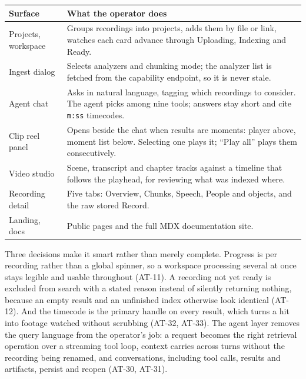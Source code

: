 \documentclass[11pt,a4paper]{article}
\begin{document}
\begin{center}
\centering
\footnotesize
\begin{tabularx}{\textwidth}{@{}L{2.8cm}X@{}}
\toprule
\textbf{Surface} & \textbf{What the operator does} \\
\midrule
Projects, workspace & Groups recordings into projects, adds them by file or link, watches
each card advance through Uploading, Indexing and Ready. \\
Ingest dialog & Selects analyzers and chunking mode; the analyzer list is fetched from the
capability endpoint, so it is never stale. \\
Agent chat & Asks in natural language, tagging which recordings to consider. The agent
picks among nine tools; answers stay short and cite \texttt{m:ss} timecodes. \\
Clip reel panel & Opens beside the chat when results are moments: player above, moment
list below. Selecting one plays it; ``Play all'' plays them consecutively. \\
Video studio & Scene, transcript and chapter tracks against a timeline that follows the
playhead, for reviewing what was indexed where. \\
Recording detail & Five tabs: Overview, Chunks, Speech, People and objects, and the raw
stored Record. \\
Landing, docs & Public pages and the full MDX documentation site. \\
\bottomrule
\end{tabularx}
\end{center}

Three decisions make it smart rather than merely complete. Progress is per recording rather
than a global spinner, so a workspace processing several at once stays legible and usable
throughout (AT-11). A recording not yet ready is excluded from search with a stated
reason instead of silently returning nothing, because an empty result and an unfinished
index otherwise look identical (AT-12). And the timecode is the primary handle on every
result, which turns a hit into footage watched without scrubbing (AT-32, AT-33). The agent
layer removes the query language from the operator's job: a request becomes the right
retrieval operation over a streaming tool loop, context carries across turns without the
recording being renamed, and conversations, including tool calls, results and artifacts,
persist and reopen (AT-30, AT-31).

\end{document}
